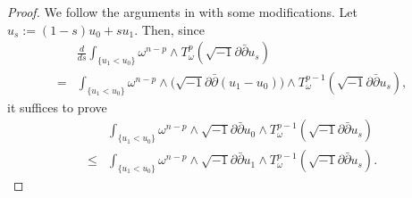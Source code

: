 \documentclass{amsart}
\numberwithin{equation}{section}
\theoremstyle{plain}
\theoremstyle{definition}
\theoremstyle{remark}
\newcommand{\delb}{\sqrt{-1}\partial\bar{\partial}}
\begin{document}
\begin{proof}
    We follow the arguments in \cite[Theorem 4.1]{BT} with some modifications.
    Let $u_s:=(1-s)u_0+su_1$. Then, since
    \begin{equation*}
        \begin{aligned}
            &\frac{d}{ds}\int_{\{u_1<u_0\}}\omega^{n-p}\wedge T^p_\omega(\delb u_s)\\
            =&\int_{\{u_1<u_0\}}\omega^{n-p}\wedge\big(\delb (u_1-u_0)\big)\wedge T^{p-1}_\omega(\delb u_s),
        \end{aligned}
    \end{equation*}
    it suffices to prove
    \begin{equation}\label{eq:lincomp'}
        \begin{aligned}
            &\int_{\{u_1<u_0\}}\omega^{n-p}\wedge\delb u_0\wedge T^{p-1}_\omega(\delb u_s)\\
            \le&\int_{\{u_1<u_0\}}\omega^{n-p}\wedge\delb u_1\wedge T^{p-1}_\omega(\delb u_s).
        \end{aligned}
    \end{equation}
    

\end{proof}
\end{document}
